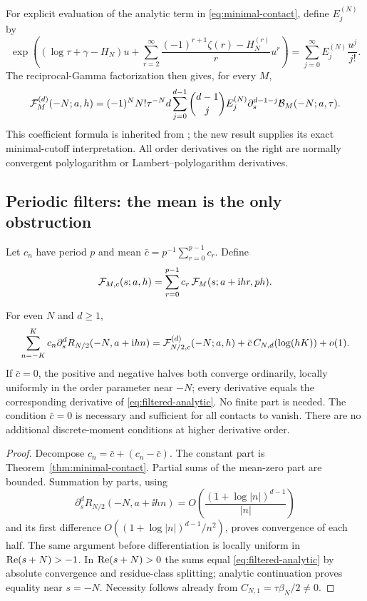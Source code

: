 For explicit evaluation of the analytic term in
\eqref{eq:minimal-contact}, define \(E_j^{(N)}\) by
\begin{equation}\label{eq:root-E}
 \exp\left((\log\tau+\gamma-H_N)u+
   \sum_{r=2}^{\infty}
       \frac{(-1)^{r+1}\zeta(r)-H_N^{(r)}}r u^r\right)
   =\sum_{j=0}^{\infty}E_j^{(N)}\frac{u^j}{j!}.
\end{equation}
The reciprocal-Gamma factorization then gives, for every \(M\),
\begin{equation}\label{eq:root-analytic-jets}
 {\cal F}_M^{(d)}(-N;a,h)
 =(-1)^NN!\tau^{-N}d
   \sum_{j=0}^{d-1}\binom{d-1}{j}E_j^{(N)}
       \partial_s^{d-1-j}{\cal B}_M(-N;a,\tau).
\end{equation}
This coefficient formula is inherited from \cite{RepoVertical};
the new result supplies its exact minimal-cutoff interpretation.
All order derivatives on the right are normally convergent
polylogarithm or Lambert--polylogarithm derivatives.

\subsection{Periodic filters: the mean is the only obstruction}

Let \(c_n\) have period \(p\) and mean
\(\bar c=p^{-1}\sum_{r=0}^{p-1}c_r\). Define
\begin{equation}\label{eq:filtered-analytic}
 {\cal F}_{M,c}(s;a,h)=
    \sum_{r=0}^{p-1}c_r\,
       {\cal F}_M(s;a+\mathrm i hr,ph).
\end{equation}

\begin{theorem}\label{thm:filter-all}
For even \(N\) and \(d\geq1\),
\begin{equation}\label{eq:weighted-contact}
 \sum_{n=-K}^{K}c_n\partial_s^dR_{N/2}(-N,a+\mathrm i hn)
 =
 {\cal F}_{N/2,c}^{(d)}(-N;a,h)
 +\bar c\,C_{N,d}(\log(hK))+o(1).
\end{equation}
If \(\bar c=0\), the positive and negative halves both converge
ordinarily, locally uniformly in the order parameter near \(-N\);
every derivative equals the corresponding derivative of
\eqref{eq:filtered-analytic}. No finite part is needed.
The condition \(\bar c=0\) is necessary and sufficient for all
contacts to vanish. There are no additional discrete-moment
conditions at higher derivative order.
\end{theorem}

\begin{proof}
Decompose \(c_n=\bar c+(c_n-\bar c)\). The constant part is
Theorem~\ref{thm:minimal-contact}. Partial sums of the mean-zero
part are bounded. Summation by parts, using
\[
 \partial_s^dR_{N/2}(-N,a+\ii hn)
     =O\!\left(\frac{(1+\log|n|)^{d-1}}{|n|}\right)
\]
and its first difference
\(O((1+\log|n|)^{d-1}/n^2)\), proves convergence of each half.
The same argument before differentiation is locally uniform in
\(\operatorname{Re}(s+N)>-1\). In \(\operatorname{Re}(s+N)>0\) the sums equal
\eqref{eq:filtered-analytic} by absolute convergence and residue-class
splitting; analytic continuation proves equality near \(s=-N\).
Necessity follows already from
\(C_{N,1}=\tau\beta_N/2\neq0\).
\end{proof}

